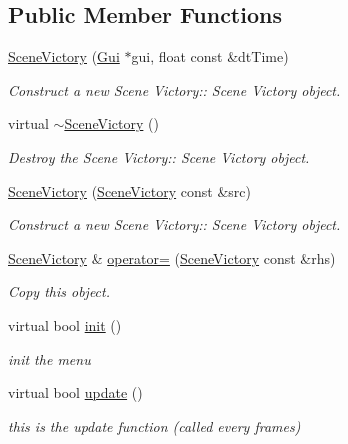 \subsection*{Public Member Functions}
\begin{DoxyCompactItemize}
\item 
\hyperlink{class_scene_victory_a1317990e7bf48ca588959c5fac2e8f57}{Scene\+Victory} (\hyperlink{class_gui}{Gui} $\ast$gui, float const \&dt\+Time)
\begin{DoxyCompactList}\small\item\em Construct a new Scene Victory\+:\+: Scene Victory object. \end{DoxyCompactList}\item 
\mbox{\label{class_scene_victory_ab625a8980d1f833f51bb1930ebe63dfb}} 
virtual \hyperlink{class_scene_victory_ab625a8980d1f833f51bb1930ebe63dfb}{$\sim$\+Scene\+Victory} ()
\begin{DoxyCompactList}\small\item\em Destroy the Scene Victory\+:\+: Scene Victory object. \end{DoxyCompactList}\item 
\hyperlink{class_scene_victory_ad7ae2aaaf4a2a107713ab351aeac9662}{Scene\+Victory} (\hyperlink{class_scene_victory}{Scene\+Victory} const \&src)
\begin{DoxyCompactList}\small\item\em Construct a new Scene Victory\+:\+: Scene Victory object. \end{DoxyCompactList}\item 
\hyperlink{class_scene_victory}{Scene\+Victory} \& \hyperlink{class_scene_victory_aba45bf336d7183dc043d916caeaad826}{operator=} (\hyperlink{class_scene_victory}{Scene\+Victory} const \&rhs)
\begin{DoxyCompactList}\small\item\em Copy this object. \end{DoxyCompactList}\item 
virtual bool \hyperlink{class_scene_victory_ab7dc4308732478fa13c8a3209f63e6b7}{init} ()
\begin{DoxyCompactList}\small\item\em init the menu \end{DoxyCompactList}\item 
virtual bool \hyperlink{class_scene_victory_aea51a7b48a3243175e1759b20f853c16}{update} ()
\begin{DoxyCompactList}\small\item\em this is the update function (called every frames) \end{DoxyCompactList}\item 

\end{DoxyCompactItemize}
